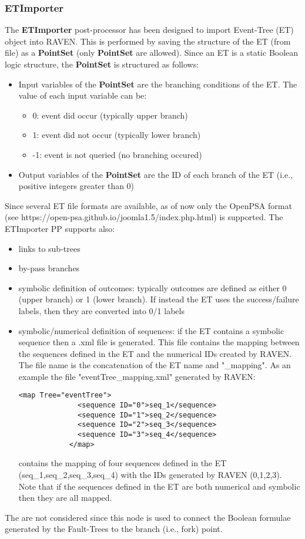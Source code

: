 \subsubsection{ETImporter}
\label{ETImporterPP}
The \textbf{ETImporter} post-processor has been designed to import Event-Tree (ET) object into
RAVEN. This is performed by saving the structure of the ET (from file) as a \textbf{PointSet} (only \textbf{PointSet} are allowed). 
Since an ET is a static Boolean logic structure, the \textbf{PointSet} is structured as follows:
\begin{itemize}
  \item Input variables of the \textbf{PointSet} are the branching conditions of the ET. The value of each input variable can be:
  \begin{itemize}
    \item  0: event did occur (typically upper branch)
    \item  1: event did not occur (typically lower branch)
    \item -1: event is not queried (no branching occured)
  \end{itemize}   
  \item Output variables of the \textbf{PointSet} are the ID of each branch of the ET (i.e., positive integers greater than 0)
\end{itemize}
Since several ET file formats are available, as of now only the OpenPSA format (see https://open-psa.github.io/joomla1.5/index.php.html) is supported.
The ETImporter PP supports also:
\begin{itemize}
  \item links to sub-trees
  \item by-pass branches
  \item symbolic definition of outcomes: typically outcomes are defined as either 0 (upper branch) or 1 (lower branch). If instead the ET uses the
        success/failure labels, then they are converted into 0/1 labels
  \item symbolic/numerical definition of sequences: if the ET contains a symbolic sequence then a .xml file is generated.  This file contains
        the mapping between the sequences defined in the ET and the numerical IDs created by RAVEN. The file name is the concatenation of the ET name
        and "\_mapping". As an example the file "eventTree\_mapping.xml" generated by RAVEN:
        \begin{lstlisting}[style=XML]
            <map Tree="eventTree">
              <sequence ID="0">seq_1</sequence>
              <sequence ID="1">seq_2</sequence>
              <sequence ID="2">seq_3</sequence>
              <sequence ID="3">seq_4</sequence>
            </map>
        \end{lstlisting}
        contains the mapping of four sequences defined in the ET (seq\_1,seq\_2,seq\_3,seq\_4) with the IDs generated by RAVEN (0,1,2,3).
        Note that if the sequences defined in the ET are both numerical and symbolic then they are all mapped.
\end{itemize}
The  are not considered since this node is used to connect the Boolean formulae generated by the
Fault-Trees to the branch (i.e., fork) point.

